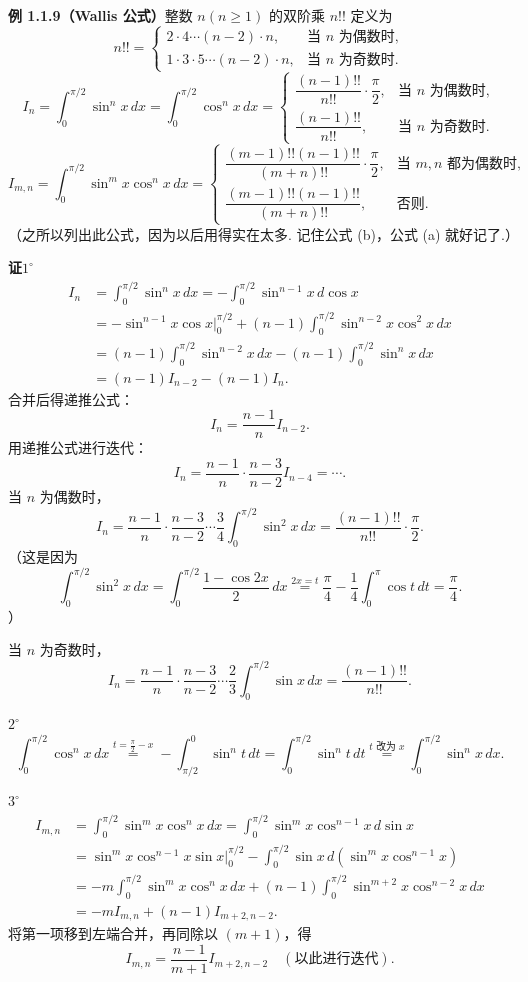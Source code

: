 \documentclass[UTF8, 12pt, fontset=fandol, oneside]{ctexart}
\begin{document}
\noindent\textbf{例 1.1.9（Wallis 公式）}\quad 整数 $n(n\ge1)$ 的双阶乘 $n!!$ 定义为
\[
n!!=
\begin{cases}
2\cdot4\cdots(n-2)\cdot n, & \text{当 }n\text{ 为偶数时},\\
1\cdot3\cdot5\cdots(n-2)\cdot n, & \text{当 }n\text{ 为奇数时}.
\end{cases}
\]
\[
I_n=\int_0^{\pi/2}\sin^n x\,dx=\int_0^{\pi/2}\cos^n x\,dx=
\begin{cases}
\dfrac{(n-1)!!}{n!!}\cdot\dfrac\pi2, & \text{当 }n\text{ 为偶数时},\\[0.8em]
\dfrac{(n-1)!!}{n!!}, & \text{当 }n\text{ 为奇数时}.
\end{cases}
\tag{a}
\]
\[
I_{m,n}=\int_0^{\pi/2}\sin^m x\cos^n x\,dx=
\begin{cases}
\dfrac{(m-1)!!(n-1)!!}{(m+n)!!}\cdot\dfrac\pi2, & \text{当 }m,n\text{ 都为偶数时},\\[0.8em]
\dfrac{(m-1)!!(n-1)!!}{(m+n)!!}, & \text{否则}.
\end{cases}
\tag{b}
\]
（之所以列出此公式，因为以后用得实在太多. 记住公式 (b)，公式 (a) 就好记了.）

\noindent\textbf{证}\quad $1^\circ$
\[
\begin{aligned}
I_n&=\int_0^{\pi/2}\sin^n x\,dx
=-\int_0^{\pi/2}\sin^{n-1}x\,d\cos x\\
&=-\sin^{n-1}x\cos x\bigg|_0^{\pi/2}
 +(n-1)\int_0^{\pi/2}\sin^{n-2}x\cos^2x\,dx\\
&=(n-1)\int_0^{\pi/2}\sin^{n-2}x\,dx
 -(n-1)\int_0^{\pi/2}\sin^n x\,dx\\
&=(n-1)I_{n-2}-(n-1)I_n.
\end{aligned}
\]
合并后得递推公式：
\[
  I_n=\frac{n-1}{n}I_{n-2}.
\]
用递推公式进行迭代：
\[
  I_n=\frac{n-1}{n}\cdot\frac{n-3}{n-2}I_{n-4}=\cdots.
\]
当 $n$ 为偶数时，
\[
  I_n=\frac{n-1}{n}\cdot\frac{n-3}{n-2}\cdots\frac34\int_0^{\pi/2}\sin^2x\,dx
  =\frac{(n-1)!!}{n!!}\cdot\frac\pi2.
\]
（这是因为
\[
\int_0^{\pi/2}\sin^2x\,dx
=\int_0^{\pi/2}\frac{1-\cos2x}{2}\,dx
\overset{2x=t}{=}\frac\pi4-\frac14\int_0^\pi\cos t\,dt=\frac\pi4.
\]
）

当 $n$ 为奇数时，
\[
  I_n=\frac{n-1}{n}\cdot\frac{n-3}{n-2}\cdots\frac23\int_0^{\pi/2}\sin x\,dx
  =\frac{(n-1)!!}{n!!}.
\]

$2^\circ$
\[
  \int_0^{\pi/2}\cos^n x\,dx
  \overset{t=\frac\pi2-x}{=}
  -\int_{\pi/2}^0\sin^n t\,dt
  =\int_0^{\pi/2}\sin^n t\,dt
  \overset{t\text{ 改为 }x}{=}
  \int_0^{\pi/2}\sin^n x\,dx.
\]

$3^\circ$
\[
\begin{aligned}
I_{m,n}
&=\int_0^{\pi/2}\sin^m x\cos^n x\,dx
=\int_0^{\pi/2}\sin^m x\cos^{n-1}x\,d\sin x\\
&=\sin^m x\cos^{n-1}x\sin x\bigg|_0^{\pi/2}
  -\int_0^{\pi/2}\sin x\,d(\sin^m x\cos^{n-1}x)\\
&=-m\int_0^{\pi/2}\sin^m x\cos^n x\,dx
  +(n-1)\int_0^{\pi/2}\sin^{m+2}x\cos^{n-2}x\,dx\\
&=-mI_{m,n}+(n-1)I_{m+2,n-2}.
\end{aligned}
\]
将第一项移到左端合并，再同除以 $(m+1)$，得
\[
  I_{m,n}=\frac{n-1}{m+1}I_{m+2,n-2}\quad(\text{以此进行迭代}).
\]
\end{document}
